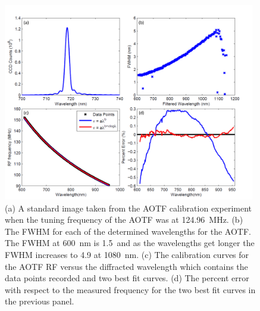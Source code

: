 \documentclass[12pt]{article}
\begin{document}
\begin{figure}
    \begin{subfigure}[t]{0\textwidth}
        \label{fig:3.1:AOTFCharaterization:a}
    \end{subfigure}
    \begin{subfigure}[t]{0\textwidth}
         \label{fig:3.1:AOTFCharaterization:b}
    \end{subfigure}
    \begin{subfigure}[t]{0\textwidth}
         \label{fig:3.1:AOTFCharaterization:c}
    \end{subfigure}
    \begin{subfigure}[t]{0\textwidth}
         \label{fig:3.1:AOTFCharaterization:d}
    \end{subfigure}
    \includegraphics[width=0.98\textwidth]{./Images/3-1-AOTFCharaterization.pdf}
    \caption{(a) A standard image taken from the AOTF calibration experiment when the tuning frequency of the AOTF was at 124.96~MHz. (b) The FWHM for each of the determined 
wavelengths for the AOTF. The FWHM at 600~nm is 1.5~and as the wavelengths get longer the FWHM increases to 4.9 at 1080~nm. (c) The calibration curves for the AOTF RF versus 
the  diffracted wavelength which contains the data points recorded and two best fit curves. (d) The percent error with respect to the measured frequency for the two best fit 
curves in the previous panel.}
    \label{fig:3.1:AOTFCharaterization}
\end{figure}
\end{document}
